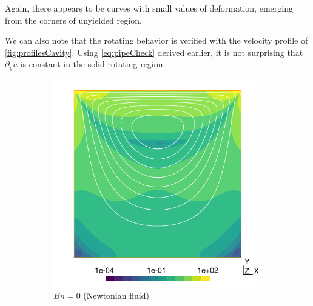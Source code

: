 \documentclass[11 pt]{report}
\begin{document}
Again, there appears to be curves with small values of deformation, emerging from the corners of unyielded region. 

We can also note that the rotating behavior is verified with the velocity profile of \cref{fig:profilesCavity}. Using \cref{eq:pipeCheck} derived earlier, it is not surprising that $\partial_y u$ is constant in the solid rotating region.

\pagebreak

\vfill
\begin{figure}[t]
    \centering
    \begin{subfigure}[t]{0.495\textwidth}
        \includegraphics[width=\textwidth]{../figures/cavity_0.pdf}
        \caption{$Bn=0$ (Newtonian fluid)}
        \label{fig:cavity0}
    \end{subfigure}
    \begin{subfigure}[t]{0.495\textwidth}

\end{subfigure}
\end{figure}
\end{document}
